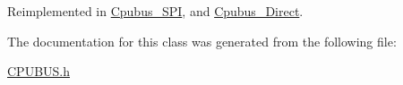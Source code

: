 Reimplemented in \hyperlink{classCpubus__SPI_a75d6b51bc35c93f1a0cfe56af86547b0}{Cpubus\-\_\-\-S\-P\-I}, and \hyperlink{classCpubus__Direct_a3cdfb2389ddbccff39dcdde141377f99}{Cpubus\-\_\-\-Direct}.



The documentation for this class was generated from the following file\-:\begin{DoxyCompactItemize}
\item 
\hyperlink{CPUBUS_8h}{C\-P\-U\-B\-U\-S.\-h}\end{DoxyCompactItemize}
